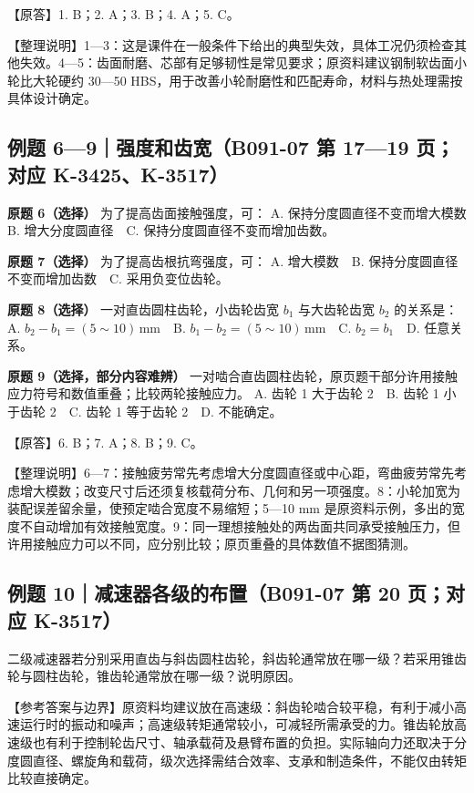\documentclass[zihao=5,a4paper,UTF8,fontset=fandol]{ctexart}
\begin{document}
【原答】1. B；2. A；3. B；4. A；5. C。


【整理说明】1—3：这是课件在一般条件下给出的典型失效，具体工况仍须检查其他失效。4—5：齿面耐磨、芯部有足够韧性是常见要求；原资料建议钢制软齿面小轮比大轮硬约 30—50 HBS，用于改善小轮耐磨性和匹配寿命，材料与热处理需按具体设计确定。


\subsection{例题 6—9｜强度和齿宽（B091-07 第 17—19 页；对应 K-3425、K-3517）}

\textbf{原题 6（选择）} 为了提高齿面接触强度，可：
A. 保持分度圆直径不变而增大模数　B. 增大分度圆直径　C. 保持分度圆直径不变而增加齿数。


\textbf{原题 7（选择）} 为了提高齿根抗弯强度，可：
A. 增大模数　B. 保持分度圆直径不变而增加齿数　C. 采用负变位齿轮。


\textbf{原题 8（选择）} 一对直齿圆柱齿轮，小齿轮齿宽 $b_1$ 与大齿轮齿宽 $b_2$ 的关系是：
A. $b_2-b_1=(5\sim10)\,\mathrm{mm}$　B. $b_1-b_2=(5\sim10)\,\mathrm{mm}$　C. $b_2=b_1$　D. 任意关系。


\textbf{原题 9（选择，部分内容难辨）} 一对啮合直齿圆柱齿轮，原页题干部分许用接触应力符号和数值重叠；比较两轮接触应力。
A. 齿轮 1 大于齿轮 2　B. 齿轮 1 小于齿轮 2　C. 齿轮 1 等于齿轮 2　D. 不能确定。


【原答】6. B；7. A；8. B；9. C。


【整理说明】6—7：接触疲劳常先考虑增大分度圆直径或中心距，弯曲疲劳常先考虑增大模数；改变尺寸后还须复核载荷分布、几何和另一项强度。8：小轮加宽为装配误差留余量，使预定啮合宽度不易缩短；5—10 mm 是原资料示例，多出的宽度不自动增加有效接触宽度。9：同一理想接触处的两齿面共同承受接触压力，但许用接触应力可以不同，应分别比较；原页重叠的具体数值不据图猜测。




\subsection{例题 10｜减速器各级的布置（B091-07 第 20 页；对应 K-3517）}

二级减速器若分别采用直齿与斜齿圆柱齿轮，斜齿轮通常放在哪一级？若采用锥齿轮与圆柱齿轮，锥齿轮通常放在哪一级？说明原因。


【参考答案与边界】原资料均建议放在高速级：斜齿轮啮合较平稳，有利于减小高速运行时的振动和噪声；高速级转矩通常较小，可减轻所需承受的力。锥齿轮放高速级也有利于控制轮齿尺寸、轴承载荷及悬臂布置的负担。实际轴向力还取决于分度圆直径、螺旋角和载荷，级次选择需结合效率、支承和制造条件，不能仅由转矩比较直接确定。
\end{document}

